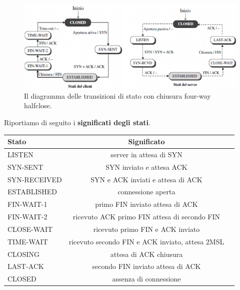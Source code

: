 \documentclass[11pt,a4paper,oneside]{book}
\theoremstyle{definition}
\begin{document}
\pagebreak

\begin{figure}[!h]
	\includegraphics[scale=0.6]{Immagini/ASF_halfclose.png}
	\centering
	\caption{Il diagramma delle transizioni di stato con chiusura four-way halfclose.}
\end{figure}
Riportiamo di seguito i \textbf{significati degli stati}.
\begin{table}[h!]
	\begin{center}
		\label{tab:table1}
		\begin{tabular}{l|c|c}
			\textbf{Stato} & \textbf{Significato}                            \\
			\hline
			LISTEN         & server in attesa di SYN                         \\
			SYN-SENT       & SYN inviato e attesa ACK                        \\
			SYN-RECEIVED   & SYN e ACK inviati e attesa di ACK               \\
			ESTABLISHED    & connessione aperta                              \\
			FIN-WAIT-1     & primo FIN inviato attesa di ACK                 \\
			FIN-WAIT-2     & ricevuto ACK primo FIN attesa di secondo FIN    \\
			CLOSE-WAIT     & ricevuto primo FIN e ACK inviato                \\
			TIME-WAIT      & ricevuto secondo FIN e ACK inviato, attesa 2MSL \\
			CLOSING        & attesa di ACK chiusura                          \\
			LAST-ACK       & secondo FIN inviato attesa di ACK               \\
			CLOSED         & assenza di connessione                          \\
		\end{tabular}
	\end{center}
\end{table}
\end{document}

